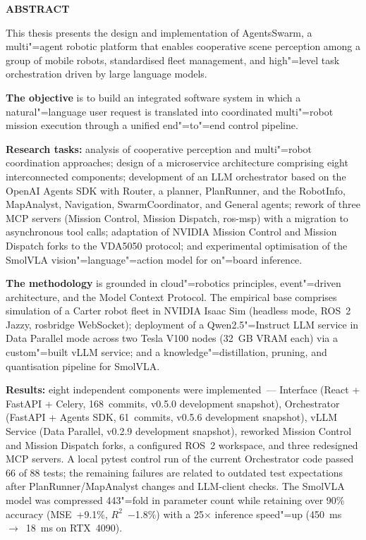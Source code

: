 \documentclass[14pt,a4paper]{extreport}
\begin{document}
\newpage
\thispagestyle{empty}
\begin{center}
  \textbf{ABSTRACT}
\end{center}
\medskip

This thesis presents the design and implementation of AgentsSwarm, a multi"=agent robotic platform that enables cooperative scene perception among a group of mobile robots, standardised fleet management, and high"=level task orchestration driven by large language models.

\textbf{The objective} is to build an integrated software system in which a natural"=language user request is translated into coordinated multi"=robot mission execution through a unified end"=to"=end control pipeline.

\textbf{Research tasks:} analysis of cooperative perception and multi"=robot coordination approaches; design of a microservice architecture comprising eight interconnected components; development of an LLM orchestrator based on the OpenAI Agents SDK with Router, a planner, PlanRunner, and the RobotInfo, MapAnalyst, Navigation, SwarmCoordinator, and General agents; rework of three MCP servers (Mission Control, Mission Dispatch, ros-msp) with a migration to asynchronous tool calls; adaptation of NVIDIA Mission Control and Mission Dispatch forks to the VDA5050 protocol; and experimental optimisation of the SmolVLA vision"=language"=action model for on"=board inference.

\textbf{The methodology} is grounded in cloud"=robotics principles, event"=driven architecture, and the Model Context Protocol. The empirical base comprises simulation of a Carter robot fleet in NVIDIA Isaac Sim (headless mode, ROS~2 Jazzy, rosbridge WebSocket); deployment of a Qwen2.5"=Instruct LLM service in Data Parallel mode across two Tesla V100 nodes (32~GB VRAM each) via a custom"=built vLLM service; and a knowledge"=distillation, pruning, and quantisation pipeline for SmolVLA.

\textbf{Results:} eight independent components were implemented~--- Interface (React + FastAPI + Celery, 168~commits, v0.5.0 development snapshot), Orchestrator (FastAPI + Agents SDK, 61~commits, v0.5.6 development snapshot), vLLM Service (Data Parallel, v0.2.9 development snapshot), reworked Mission Control and Mission Dispatch forks, a configured ROS~2 workspace, and three redesigned MCP servers. A local pytest control run of the current Orchestrator code passed 66 of 88 tests; the remaining failures are related to outdated test expectations after PlanRunner/MapAnalyst changes and LLM-client checks. The SmolVLA model was compressed 443"=fold in parameter count while retaining over 90\% accuracy (MSE~+9.1\%, $R^2$~$-$1.8\%) with a 25$\times$ inference speed"=up (450~ms~$\to$~18~ms on RTX~4090).
\end{document}
